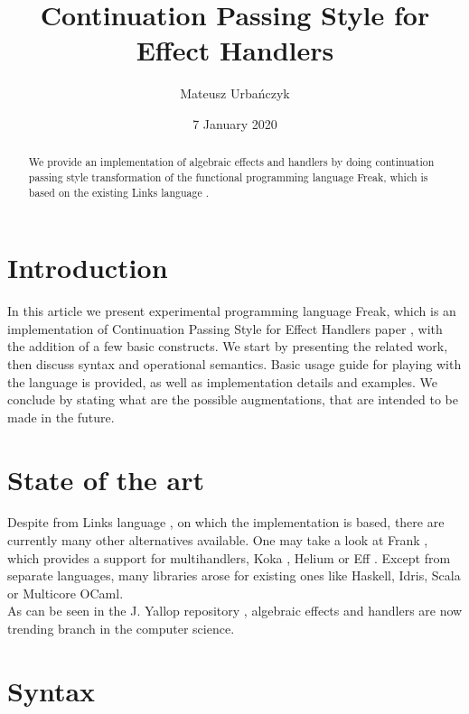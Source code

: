 \documentclass{article}
\title{Continuation Passing Style for Effect Handlers}
\author{Mateusz Urbańczyk}
\date{7 January 2020}
\theoremstyle{definition}
\theoremstyle{lemma}
\theoremstyle{observation}
\theoremstyle{theorem}
\begin{document}
\maketitle

\begin{abstract}

    We provide an implementation of algebraic effects and handlers by doing continuation
    passing style transformation of the functional programming language Freak,
    which is based on the existing Links language \cite{handlers-cps}.

\end{abstract}

\section{Introduction}

In this article we present experimental programming language Freak, which is an
implementation of Continuation Passing Style for Effect Handlers paper \cite{handlers-cps},
with the addition of a few basic constructs. We start by presenting the related work,
then discuss syntax and operational semantics. Basic usage guide for playing with
the language is provided, as well as implementation details and examples. We conclude
by stating what are the possible augmentations, that are intended to be made in the future.

\section{State of the art}

    Despite from Links language \cite{handlers-cps}, on which the implementation
    is based, there are currently many other alternatives available. One may take
    a look at Frank \cite{frank}, which provides a support for multihandlers,
    Koka \cite{leijen-koka}, Helium \cite{helium} or Eff \cite{eff}. Except from
    separate languages, many libraries arose for existing ones like Haskell,
    Idris, Scala or Multicore OCaml. \\

    As can be seen in the J. Yallop repository \cite{effects-bibliography},
    algebraic effects and handlers are now trending branch in the computer science.

\section{Syntax}
\end{document}
